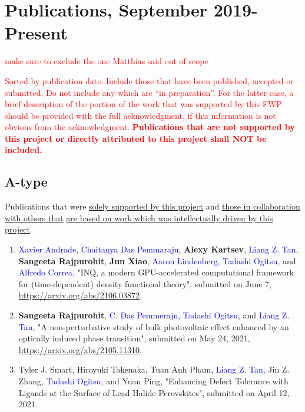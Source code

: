 \section{Publications, September 2019-Present}
\label{sec:publications}

\textcolor{red}{make sure to exclude the one Matthias said out of scope}

\textcolor{red}{
Sorted by publication date. Include those that have been published, accepted or submitted. Do not include any which are “in preparation”. 
For the latter case, a brief description of the portion of the work that was supported by this FWP should be provided with the full acknowledgment, if this information is not obvious from the acknowledgment. {\bf Publications that are not supported by this project or directly attributed to this project shall NOT be included.}}

\subsection{A-type}

Publications that were \underline{solely supported by this project} and \underline{those in collaboration with others that} \underline{are based on work which was intellectually driven by this project}.
\begin{enumerate}
    \item \textcolor{blue}{Xavier Andrade}, \textcolor{blue}{Chaitanya Das Pemmaraju}, {\bf Alexy Kartsev}, \textcolor{blue}{Liang Z. Tan}, {\bf Sangeeta Rajpurohit}, {\bf Jun Xiao},  \textcolor{blue}{Aaron Lindenberg}, \textcolor{blue}{Tadashi Ogitsu}, and \textcolor{blue}{Alfredo Correa}, "INQ, a modern GPU-accelerated computational framework for (time-dependent) density functional theory", submitted on June 7, \url{https://arxiv.org/abs/2106.03872}.
    \item {\bf Sangeeta Rajpurohit}, \textcolor{blue}{C. Das Pemmeraju}, \textcolor{blue}{Tadashi Ogitsu}, and \textcolor{blue}{Liang Z. Tan}, "A non-perturbative study of bulk photovoltaic effect enhanced by an optically induced phase transition", submitted on May 24, 2021, \url{https://arxiv.org/abs/2105.11310}.
    \item Tyler J. Smart, Hiroyuki Takenaka, Tuan Anh Pham, \textcolor{blue}{Liang Z. Tan}, Jin Z. Zhang, \textcolor{blue}{Tadashi Ogitsu}, and Yuan Ping, "Enhancing Defect Tolerance with Ligands at the Surface of Lead Halide Perovskites", submitted on April 12, 2021.
\end{enumerate}

